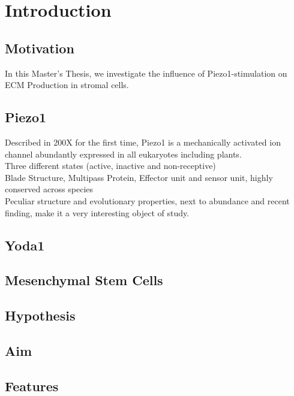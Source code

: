\newcommand{\package}{\emph}


\chapter{Introduction}

\section{Motivation}
\label{sec:motivation}

In this Master's Thesis, we investigate the influence of Piezo1-stimulation on ECM Production in stromal cells.

\section{Piezo1}
Described in 200X for the first time, Piezo1 is a  mechanically activated ion channel abundantly expressed in all eukaryotes including plants.\cite{Coste55} \\
Three different states (active, inactive and non-receptive)\\
Blade Structure, Multipass Protein, Effector unit and sensor unit, highly conserved across species\\
Peculiar structure and evolutionary properties, next to abundance and recent finding, make it a very interesting object of study. 

\section{Yoda1}


\section{Mesenchymal Stem Cells}

\section{Hypothesis}

\section{Aim}

\section{Features}
\label{sec:features}

